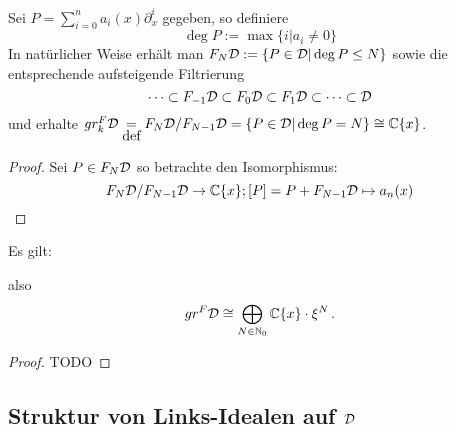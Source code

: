 \begin{defn}
  Sei $P=\sum_{i=0}^na_i(x)\partial_x^i$ gegeben, so definiere 
  \[
    \deg P:=\max\{i|a_i\neq 0\}
  \]
  In natürlicher Weise erhält man $F_N\mathcal{D}:=\{P\in\mathcal{D}|\deg P\leq N\}$ sowie die
  entsprechende aufsteigende Filtrierung
  \[
    \cdots\subset F_{-1}\mathcal{D}\subset F_{0}\mathcal{D}\subset
    F_{1}\mathcal{D}\subset\cdots\subset\mathcal{D}
  \]
  und erhalte $gr_k^F\mathcal{D}\underset{\mbox{def}}{=}F_N\mathcal{D}\slash F_{N-1}\mathcal{D}
  =\{P\in\mathcal{D}|\deg P=N\}\cong\mathbb{C}\{x\}$.
\end{defn}

\begin{proof}
  Sei $P\in F_N\mathcal{D}$ so betrachte den Isomorphismus:
  \[
    F_N\mathcal{D}\slash F_{N-1}\mathcal{D}\rightarrow \mathbb{C}\{x\}; [P]=P+F_{N-1}\mathcal{D}\mapsto a_n(x)
  \]
\end{proof}

\begin{prop}
  Es gilt:
  \begin{center}
  \end{center}
  also
  \[ gr^F\mathcal{D} \cong \bigoplus_{N\in\mathbb{N}_0}\mathbb{C}\{x\}\cdot \xi^N \,. \]
\end{prop}
\begin{proof} TODO
  \begin{comment}
    Treffen?
  \end{comment}
\end{proof}

\begin{comment}
  \subsection{Weyl Algebra als Graduierter Ring}
  Sei $A$ nun einer der drei Koeffizienten Ringe, welche zuvor behandelt
  wurden.  Der Ring $A<\partial_x>$ kommt zusammen mit einer aufsteigenden
  Filtrierung, welche wir mit $F(A<\partial_x)$ bezeichen werden.  Sei $P$ ein
  bzgl. \ref{prop:weyl_eindeutige_schreibung} minimal geschriebener Operator,
  so ist $P$ in $F_k$ falls der maximale Grad von $\partial_x$ in $P$ kleiner
  oder gleich $k$. So definiere den Grad $deg P$ von $P$ als die Eindeutige
  ganze Zahl $k$ mit $P\in F_kA<\partial_x>\slash F_{k-1}<\partial_x>$

  Unabhängigkeit von Schreibung wird in Sabbah Script behauptet
\end{comment}

\subsection{Struktur von Links-Idealen auf $\mathcal{D}$}

